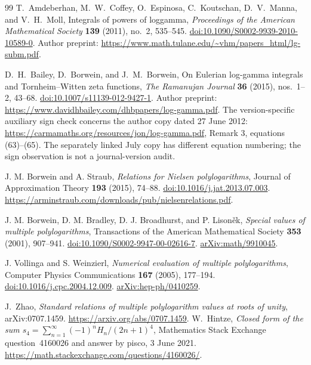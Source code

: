 \begin{thebibliography}{99}
T.~Amdeberhan, M.~W.~Coffey, O.~Espinosa, C.~Koutschan,
D.~V.~Manna, and V.~H.~Moll, Integrals of powers of loggamma,
\emph{Proceedings of the American Mathematical Society}
\textbf{139} (2011), no.~2, 535--545.
\href{https://doi.org/10.1090/S0002-9939-2010-10589-0}{doi:10.1090/S0002-9939-2010-10589-0}.
Author preprint:
\url{https://www.math.tulane.edu/~vhm/papers_html/lg-subm.pdf}.

D.~H.~Bailey, D.~Borwein, and J.~M.~Borwein,
On Eulerian log-gamma integrals and Tornheim--Witten zeta functions,
\emph{The Ramanujan Journal} \textbf{36} (2015), nos.~1--2, 43--68.
\href{https://doi.org/10.1007/s11139-012-9427-1}{doi:10.1007/s11139-012-9427-1}.
Author preprint:
\url{https://www.davidhbailey.com/dhbpapers/log-gamma.pdf}.
The version-specific auxiliary sign check concerns the author copy dated
27 June 2012: \url{https://carmamaths.org/resources/jon/log-gamma.pdf},
Remark 3, equations (63)--(65). The separately linked July copy has different
equation numbering; the sign observation is not a journal-version audit.

J. M. Borwein and A. Straub, \emph{Relations for Nielsen polylogarithms},
Journal of Approximation Theory \textbf{193} (2015), 74--88.
\href{https://doi.org/10.1016/j.jat.2013.07.003}{doi:10.1016/j.jat.2013.07.003}.
\url{https://arminstraub.com/downloads/pub/nielsenrelations.pdf}.


J. M. Borwein, D. M. Bradley, D. J. Broadhurst, and P. Lison\v ek,
\emph{Special values of multiple polylogarithms},
Transactions of the American Mathematical Society \textbf{353} (2001),
907--941.
\href{https://doi.org/10.1090/S0002-9947-00-02616-7}{doi:10.1090/S0002-9947-00-02616-7}.
\href{https://arxiv.org/abs/math/9910045}{arXiv:math/9910045}.


J. Vollinga and S. Weinzierl, \emph{Numerical evaluation of multiple
polylogarithms}, Computer Physics Communications \textbf{167} (2005),
177--194.
\href{https://doi.org/10.1016/j.cpc.2004.12.009}{doi:10.1016/j.cpc.2004.12.009}.
\href{https://arxiv.org/abs/hep-ph/0410259}{arXiv:hep-ph/0410259}.

J.~Zhao, \emph{Standard relations of multiple polylogarithm values at roots
of unity}, arXiv:0707.1459. \url{https://arxiv.org/abs/0707.1459}.
W.~Hintze, \emph{Closed form of the sum
$s_4=\sum_{n=1}^{\infty}(-1)^nH_n/(2n+1)^4$},
Mathematics Stack Exchange question~4160026 and answer by pisco,
3 June 2021.
\url{https://math.stackexchange.com/questions/4160026/}.


\end{thebibliography}
